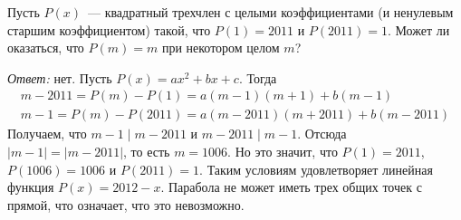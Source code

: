 Пусть $P(x)$~--- квадратный трехчлен с целыми коэффициентами
(и ненулевым старшим коэффициентом) такой, что $P(1) = 2011$ и $P(2011) = 1$.
Может ли оказаться, что $P(m) = m$ при некотором целом $m$?

\solution
\emph{Ответ:} нет.
Пусть $P(x) = a x^2 + b x + c$.
Тогда
\begin{gather*}
    m - 2011 = P(m) - P(1) = a (m - 1) (m + 1) + b (m - 1)
\\
    m - 1 = P(m) - P(2011) = a (m - 2011) (m + 2011) + b (m - 2011)
\end{gather*}
Получаем, что $m - 1 \mid m - 2011$ и $m - 2011 \mid m - 1$.
Отсюда $|m - 1| = |m - 2011|$, то есть $m = 1006$.
Но это значит, что
$P(1) = 2011$, $P(1006) = 1006$ и $P(2011) = 1$.
Таким условиям удовлетворяет линейная функция $P(x) = 2012 - x$.
Парабола не может иметь трех общих точек с прямой, что означает, что это
невозможно.

